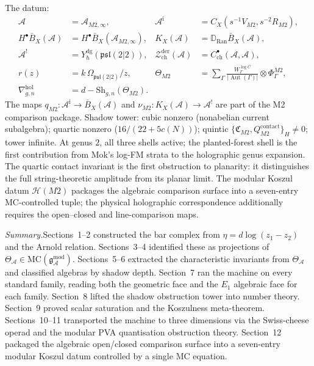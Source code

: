 \documentclass[11pt]{report}
\theoremstyle{definition}
\theoremstyle{remark}
\providecommand{\cA}{\mathcal{A}}
\providecommand{\cH}{\mathcal{H}}
\providecommand{\cZ}{\mathcal{Z}}
\providecommand{\barB}{\bar{B}}
\providecommand{\Ran}{\mathrm{Ran}}
\providecommand{\MC}{\mathrm{MC}}
\providecommand{\FM}{\overline{C}}
\providecommand{\gAmod}{\mathfrak{g}^{\mathrm{mod}}_\cA}
\providecommand{\dg}{\mathrm{dg}}
\providecommand{\contact}{\mathrm{contact}}
\providecommand{\der}{\mathrm{der}}
\providecommand{\hol}{\mathrm{hol}}
\providecommand{\ch}{\mathrm{ch}}
\DeclareMathOperator{\Aut}{Aut}
\numberwithin{equation}{section}
\begin{document}
The datum:
\begin{align*}
\cA &= \cA_{M2,\infty},
 & \cA^{\mathrm i} &= C_X(s^{-1}V_{M2},s^{-2}R_{M2}),\\
H^\bullet\barB_X(\cA)&=H^\bullet\barB_X(\cA_{M2,\infty}),
 &K_X(\cA)&=\mathbb D_{\Ran}\barB_X(\cA),\\
\cA^! &= Y^{\dg}_\hbar(\mathfrak{psl}(2|2)),
 & \cZ^{\der}_{\ch}(\cA) &= C^\bullet_{\ch}(\cA,\cA),\\
r(z) &= k\,\Omega_{\mathfrak{psl}(2|2)}/z,
 & \Theta_{M2} &= \sum_\Gamma
 \tfrac{W^{\log\FM}_\Gamma}{|\Aut(\Gamma)|}\otimes\Phi^{M2}_\Gamma,\\
\nabla^{\hol}_{g,n} &= d - \mathrm{Sh}_{g,n}(\Theta_{M2}).
\end{align*}
The maps
$q_{M2}\colon\cA^{\mathrm i}\to\barB_X(\cA)$ and
$\nu_{M2}\colon K_X(\cA)\to\cA^!$ are part of the M2 comparison
package.
Shadow tower: cubic nonzero (nonabelian current subalgebra);
quartic nonzero ($16/(22 + 5c(N))$); quintic
$\{\mathfrak C_{M2}, Q^{\contact}_{M2}\}_H \neq 0$; tower
infinite. At genus $2$, all three shells active; the
planted-forest shell is the first contribution from Mok's
log-FM strata to the holographic genus expansion. The quartic
contact invariant is the first obstruction to planarity: it
distinguishes the full string-theoretic amplitude from its
planar limit. The modular Koszul datum $\cH(M2)$ packages the
algebraic comparison surface into a seven-entry MC-controlled tuple;
the physical holographic correspondence additionally requires the
open--closed and line-comparison maps.

\bigskip\noindent\emph{Summary.}\enspace Sections~1--2
constructed the bar complex from $\eta = d\log(z_1 - z_2)$ and
the Arnold relation. Sections~3--4 identified these as
projections of $\Theta_\cA \in \MC(\gAmod)$. Sections~5--6
extracted the characteristic invariants from $\Theta_\cA$ and
classified algebras by shadow depth. Section~7 ran the
machine on every standard family, reading both the geometric
face and the $E_1$ algebraic face for each family. Section~8
lifted the shadow obstruction tower into number theory.
Section~9 proved scalar saturation and the Koszulness
meta-theorem. Sections~10--11 transported the machine to
three dimensions via the Swiss-cheese operad and the modular
PVA quantisation obstruction theory. Section~12 packaged
the algebraic open/closed comparison surface into a seven-entry
modular Koszul datum controlled by a single MC equation.


\end{document}
